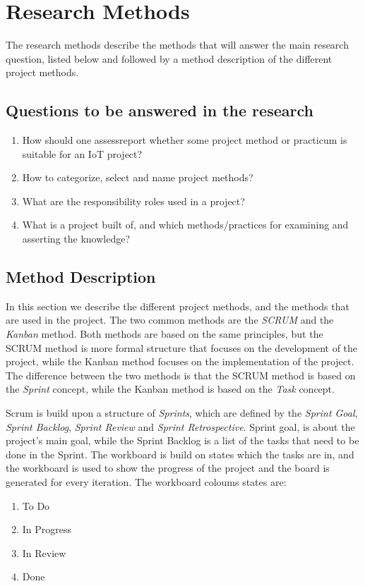 \section{Research Methods}


The research methods describe the methods that will answer the main research question, listed below and followed by a method description of the different project methods.


\subsection{Questions to be answered in the research}

\begin{enumerate}
    \item{How should one assess\/report whether some project method or practicum is suitable for an IoT project?}
    \item{How to categorize, select and name project methods?}
    \item{What are the responsibility roles used in a project?}
    \item{What is a project built of, and which methods/practices for examining and asserting the knowledge?}
\end{enumerate}

\subsection{Method Description}

In this section we describe the different project methods, and the methods that are used in the project.
The two common methods are the \textit{SCRUM} and the \textit{Kanban} method.
Both methods are based on the same principles, but the SCRUM method is more formal structure that focuses on the development of the project, while the Kanban method focuses on the implementation of the project.
The difference between the two methods is that the SCRUM method is based on the \textit{Sprint} concept, while the Kanban method is based on the \textit{Task} concept.

Scrum\cite{atlassianScrum} is build upon a structure of \textit{Sprints}, which are defined by the \textit{Sprint Goal}, \textit{Sprint Backlog}, \textit{Sprint Review} and \textit{Sprint Retrospective}.
Sprint goal, is about the project's main goal, while the Sprint Backlog is a list of the tasks that need to be done in the Sprint.
The workboard is build on states which the tasks are in, and the workboard is used to show the progress of the project and the board is generated for every iteration.
The workboard coloums states are:
\begin{enumerate}
    \item{To Do}
    \item{In Progress}
    \item{In Review}
    \item{Done}
\end{enumerate}

